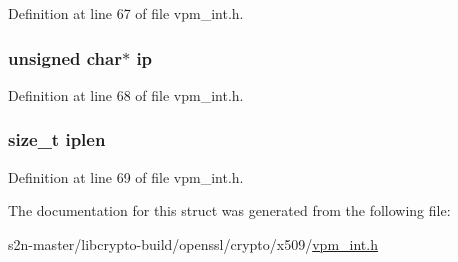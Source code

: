 Definition at line 67 of file vpm\+\_\+int.\+h.

\subsubsection[{\texorpdfstring{ip}{ip}}]{\setlength{\rightskip}{0pt plus 5cm}unsigned char$\ast$ ip}\hypertarget{struct_x509___v_e_r_i_f_y___p_a_r_a_m___i_d__st_a82531b0256395947cfb0eab985117caa}{}\label{struct_x509___v_e_r_i_f_y___p_a_r_a_m___i_d__st_a82531b0256395947cfb0eab985117caa}


Definition at line 68 of file vpm\+\_\+int.\+h.

\subsubsection[{\texorpdfstring{iplen}{iplen}}]{\setlength{\rightskip}{0pt plus 5cm}size\+\_\+t iplen}\hypertarget{struct_x509___v_e_r_i_f_y___p_a_r_a_m___i_d__st_a1b44021adced96d2d8dea43f3aa99c5d}{}\label{struct_x509___v_e_r_i_f_y___p_a_r_a_m___i_d__st_a1b44021adced96d2d8dea43f3aa99c5d}


Definition at line 69 of file vpm\+\_\+int.\+h.



The documentation for this struct was generated from the following file\+:\begin{DoxyCompactItemize}
\item 
s2n-\/master/libcrypto-\/build/openssl/crypto/x509/\hyperlink{vpm__int_8h}{vpm\+\_\+int.\+h}\end{DoxyCompactItemize}
